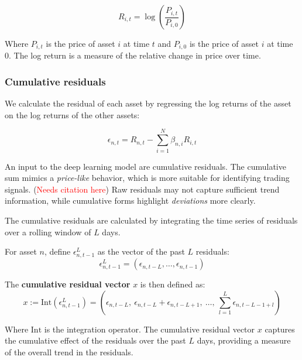 \documentclass[12pt]{article}
\begin{document}
\begin{equation}
    R_{i,t} = \log\left( \frac{P_{i,t}}{P_{i,0}} \right)
    \label{eq:log_cumulative_return}
\end{equation}

Where $P_{i,t}$ is the price of asset $i$ at time $t$ and $P_{i,0}$ is the price of asset $i$ at time $0$. The log return is a measure of the relative change in price over time.

\subsubsection{Cumulative residuals}
We calculate the residual of each asset by regressing the log returns of the asset on the log returns of the other assets:

\begin{equation}
    \epsilon_{n,t} = R_{n,t} - \sum_{i=1}^{N} \beta_{n,i} R_{i,t}
    \label{eq:residual}
\end{equation}

An input to the deep learning model are cumulative residuals. 
The cumulative sum mimics a \textit{price-like} behavior, which is more suitable for identifying trading signals. (\textcolor{red}{Needs citation here}) Raw residuals may not capture sufficient trend information, while cumulative forms highlight \textit{deviations} more clearly.

The cumulative residuals are calculated by integrating the time series of residuals over a rolling window of $L$ days.

For asset $n$, define $\epsilon^L_{n,t-1}$ as the vector of the past $L$ residuals:
\begin{equation}
    \epsilon^L_{n,t-1} = (\epsilon_{n,t-L}, \ldots, \epsilon_{n,t-1})
    \label{eq:residual_vector}
\end{equation}

The \textbf{cumulative residual vector} $x$ is then defined as:
\begin{equation}
    x := \mathrm{Int}(\epsilon^L_{n,t-1}) 
      = \left( \epsilon_{n,t-L},\ \epsilon_{n,t-L} + \epsilon_{n,t-L+1},\ \ldots,\ \sum_{l=1}^{L} \epsilon_{n,t-L-1+l} \right)
    \label{eq:cumulative_residual}
\end{equation}

Where $\mathrm{Int}$ is the integration operator. The cumulative residual vector $x$ captures the cumulative effect of the residuals over the past $L$ days, providing a measure of the overall trend in the residuals.
\end{document}
